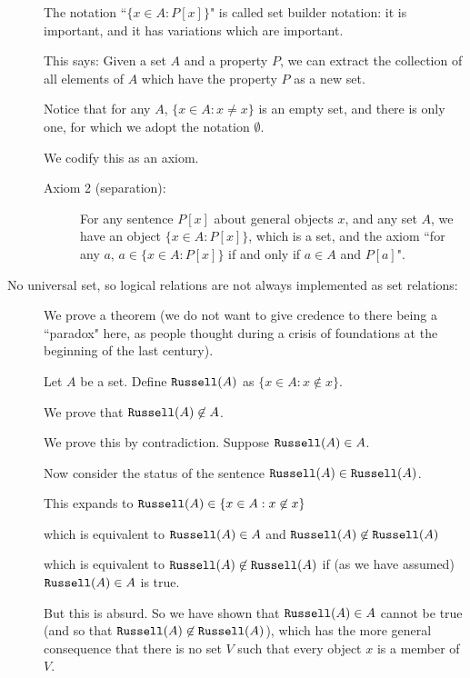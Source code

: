 \documentclass[12pt]{article}
\begin{document}
\begin{description}
The notation ``$\{x \in A:P[x]\}$" is called set builder notation:  it is important, and it has variations which are important.

This says:  Given a set $A$ and a property $P$, we can extract the collection of all elements of $A$ which have the property $P$ as a new set.

Notice that for any $A$, $\{x \in A:x \neq x\}$ is an empty set, and there is only one, for which we adopt the notation $\emptyset$.

We codify this as an axiom.

\begin{description}

\item[Axiom 2 (separation):]  For any sentence $P[x]$ about general objects $x$, and any set $A$, we have
an object $\{x \in A:P[x]\}$, which is a set, and the axiom ``for any $a$, $a \in \{x \in A:P[x]\}$ if and only if $a \in A$ and $P[a]$".

\end{description}

\item[No universal set, so logical relations are not always implemented as set relations:]

We prove a theorem (we do not want to give credence to there being a ``paradox" here, as people thought during a crisis of foundations at the beginning of the last century).

Let $A$ be a set.  Define ${\tt Russell}(A)$ as $\{x \in A:x \not\in x\}$.

We prove that ${\tt Russell}(A)\not\in A$.

We prove this by contradiction.  Suppose ${\tt Russell}(A)\in A$.  

Now consider the status of the sentence ${\tt Russell}(A) \in {\tt Russell}(A)$.

This expands to ${\tt Russell}(A) \in \{x \in A:x \not\in x\}$

which is equivalent to ${\tt Russell}(A) \in A$ and ${\tt Russell}(A) \not\in {\tt Russell}(A)$

which is equivalent to ${\tt Russell}(A) \not\in {\tt Russell}(A)$ if (as we have assumed) ${\tt Russell}(A)\in A$ is true.

But this is absurd.  So we have shown that ${\tt Russell}(A)\in A$  cannot be true (and so that ${\tt Russell}(A) \not\in {\tt Russell}(A)$), which has the more general consequence
that there is no set $V$ such that every object $x$ is a member of $V$.


\end{description}
\end{document}
